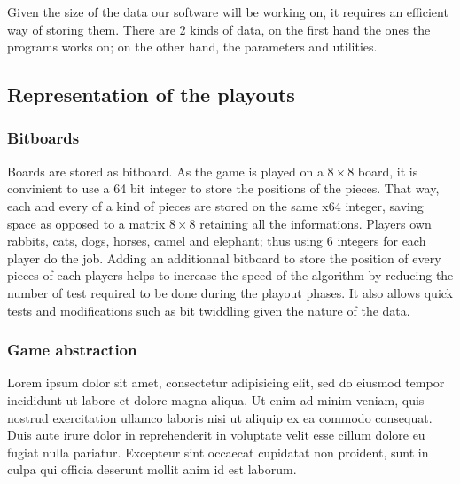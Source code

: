 Given the size of the data our software will be working on, it requires an efficient way of storing them. There are 2 kinds of data, on the first hand the ones the programs works on; on the other hand, the parameters and utilities.
\subsection{Representation of the playouts}
\subsubsection{Bitboards}
Boards are stored as bitboard. As the game is played on a \ensuremath{8\times8} board, it is convinient to use a 64 bit integer to store the positions of the pieces. That way, each and every of a kind of pieces are stored on the same x64 integer, saving space as opposed to a matrix \ensuremath{8\times8} retaining all the informations. Players own rabbits, cats, dogs, horses, camel and elephant; thus using 6 integers for each player do the job. Adding an additionnal bitboard to store the position of every pieces of each players helps to increase the speed of the algorithm by reducing the number of test required to be done during the playout phases. It also allows quick tests and modifications such as bit twiddling given the nature of the data.

\subsubsection{Game abstraction}
Lorem ipsum dolor sit amet, consectetur adipisicing elit, sed do eiusmod
tempor incididunt ut labore et dolore magna aliqua. Ut enim ad minim veniam,
quis nostrud exercitation ullamco laboris nisi ut aliquip ex ea commodo
consequat. Duis aute irure dolor in reprehenderit in voluptate velit esse
cillum dolore eu fugiat nulla pariatur. Excepteur sint occaecat cupidatat non
proident, sunt in culpa qui officia deserunt mollit anim id est laborum.

